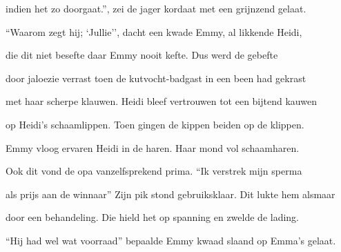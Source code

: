 indien het zo doorgaat.”,
zei de jager kordaat
met een grijnzend gelaat.

“Waarom zegt hij; ‘Jullie’’,
dacht een kwade Emmy,
al likkende Heidi,

die dit niet besefte
daar Emmy nooit kefte.
Dus werd de gebefte

door jaloezie verrast
toen de kutvocht-badgast
in een been had gekrast

met haar scherpe klauwen.
Heidi bleef vertrouwen
tot een bijtend kauwen

op Heidi’s schaamlippen.
Toen gingen de kippen
beiden op de klippen.

Emmy vloog ervaren Heidi in de haren. Haar mond vol schaamharen.

Ook dit vond de opa
vanzelfsprekend prima.
“Ik verstrek mijn sperma

als prijs aan de winnaar”
Zijn pik stond gebruiksklaar.
Dit lukte hem alsmaar

door een behandeling.
Die hield het op spanning
en zwelde de lading.

“Hij had wel wat voorraad”
bepaalde Emmy kwaad
slaand op Emma’s gelaat.
